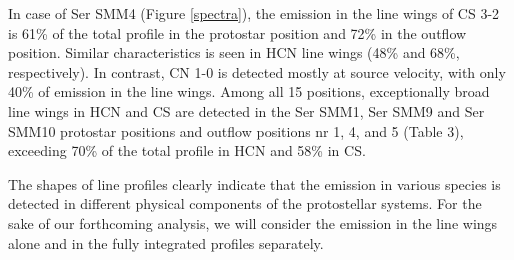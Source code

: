 \documentclass{aa}
\begin{document}
In case of Ser SMM4 (Figure \ref{spectra}), the emission in the line wings
of CS 3-2 is 61\% of the total profile 
in the protostar position and 72\% in the outflow position. Similar characteristics is 
seen in HCN line wings (48\% and 68\%, respectively). In contrast, CN 1-0 is detected 
mostly at source velocity, with only 40\% of emission in the line wings. Among all 15
positions, exceptionally broad line wings in HCN and CS are detected in 
the Ser SMM1, Ser SMM9 and Ser SMM10 protostar positions and outflow positions 
nr 1, 4, and 5 (Table 3), exceeding 70\% of the total profile in HCN and 58\% in CS.

The shapes of line profiles clearly indicate that the emission in various species is 
detected in different physical components of the protostellar systems. For the sake 
of our forthcoming analysis, we will consider the emission in the line wings alone and in 
the fully integrated profiles separately.

\end{document}
